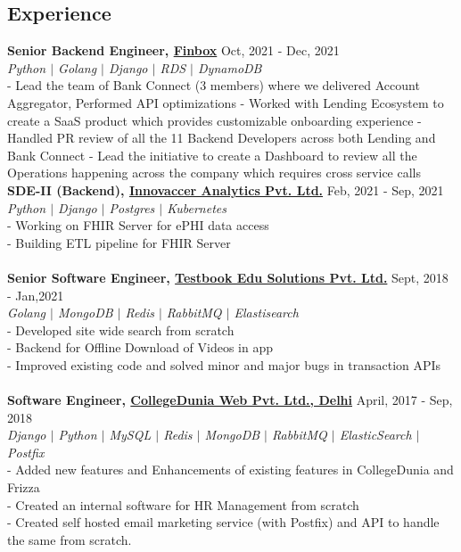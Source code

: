 \documentclass[margin, centered]{res}
\begin{document}
\begin{resume}
\section{Experience}
\textbf{Senior Backend Engineer, \href{https://finbox.in}{Finbox}} \hfill Oct, 2021 - Dec, 2021\\
\emph{\color{BlueViolet}Python $\vert$ Golang $\vert$ Django $\vert$ RDS $\vert$ DynamoDB} \\
- Lead the team of Bank Connect (3 members) where we delivered Account Aggregator, Performed API optimizations
- Worked with Lending Ecosystem to create a SaaS product which provides customizable onboarding experience
- Handled PR review of all the 11 Backend Developers across both Lending and Bank Connect
- Lead the initiative to create a Dashboard to review all the Operations happening across the company which requires cross service calls
\textbf{SDE-II (Backend), \href{https://testbook.com}{Innovaccer Analytics Pvt. Ltd.}} \hfill Feb, 2021 - Sep, 2021\\
\emph{\color{BlueViolet}Python $\vert$ Django $\vert$ Postgres $\vert$ Kubernetes } \\
- Working on FHIR Server for ePHI data access \\
- Building ETL pipeline for FHIR Server \\
\\
\textbf{Senior Software Engineer, \href{https://testbook.com}{Testbook Edu Solutions Pvt. Ltd.}} \hfill Sept, 2018 - Jan,2021\\
\emph{\color{BlueViolet}Golang $\vert$ MongoDB $\vert$ Redis $\vert$ RabbitMQ $\vert$ Elastisearch} \\
- Developed site wide search from scratch\\
- Backend for Offline Download of Videos in app \\
- Improved existing code and solved minor and major bugs in transaction APIs \\
\\
\textbf{Software Engineer, \href{https://collegedunia.com}{CollegeDunia Web Pvt. Ltd., Delhi}} \hfill April, 2017 - Sep, 2018\\
\emph{\color{BlueViolet}Django $\vert$ Python $\vert$ MySQL $\vert$ Redis $\vert$ MongoDB $\vert$ RabbitMQ $\vert$ ElasticSearch $\vert$ Postfix } \\
- Added new features and Enhancements of existing features in CollegeDunia and Frizza\\
- Created an internal software for HR Management from scratch\\
- Created self hosted email marketing service (with Postfix) and API to handle the same from scratch.\\


\end{resume}
\end{document}
